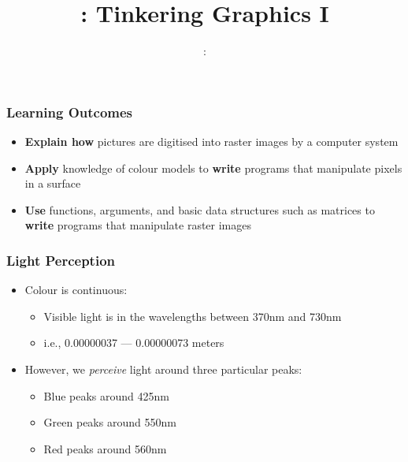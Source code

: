 \usepackage{../../beamerthemeFalmouthGamesAcademy}
\usepackage{multimedia}
\graphicspath{ {../../} }


\usepackage[normalem]{ulem}
\usepackage{wasysym}

\usepackage{pdfpages}

\usetikzlibrary{arrows,automata}







\title{\sessionnumber: Tinkering Graphics I}
\subtitle{\modulecode: \moduletitle}

\frame{\titlepage} 

\begin{frame}
	\frametitle{Learning Outcomes}
	\begin{itemize}
		\item \textbf{Explain how} pictures are digitised into raster images by a computer system
		\item \textbf{Apply} knowledge of colour models to \textbf{write} programs that manipulate pixels in a surface
		\item \textbf{Use} functions, arguments, and basic data structures such as matrices to \textbf{write} programs that manipulate raster images
	\end{itemize}
\end{frame}

\begin{frame}
	\frametitle{Light Perception}
	\begin{itemize}
		\item Colour is continuous:
		\begin{itemize}
			\item Visible light is in the wavelengths between 370nm and 730nm
			\item i.e., 0.00000037 --- 0.00000073 meters
		\end{itemize}
		\item However, we \textit{perceive} light around three particular peaks:
		\begin{itemize}
			\item Blue peaks around 425nm
			\item Green peaks around 550nm
			\item Red peaks around 560nm
		\end{itemize}
	\end{itemize}
\end{frame}

